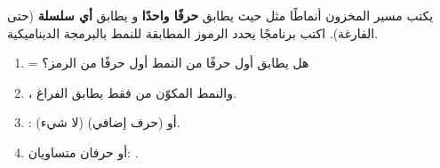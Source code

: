 \begin{statement}
يكتب مسير المخزون أنماطًا مثل  حيث  يطابق \textbf{حرفًا واحدًا} و \code{*} يطابق \textbf{أي سلسلة} (حتى الفارغة). اكتب برنامجًا يحدد الرموز المطابقة للنمط بالبرمجة الديناميكية.
\end{statement}
\begin{stepsbox}\begin{enumerate}
\item {} = هل يطابق أول  حرفًا من النمط أول  حرفًا من الرمز؟
\item {}، والنمط المكوّن من \code{*} فقط يطابق الفراغ.
\item \code{*}:  (لا شيء) أو  (حرف إضافي).
\item {} أو حرفان متساويان: .
\end{enumerate}\end{stepsbox}
